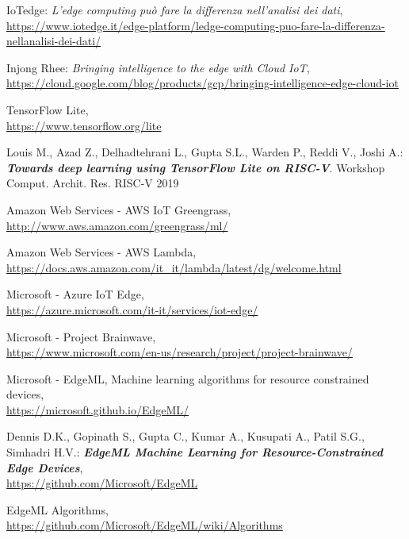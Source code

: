 \documentclass[a4paper,12pt,oneside]{book}
\begin{document}
\clearpage
\pagestyle{plain}
\fancyfoot[R]{}
\begin{thebibliography}{9}



	IoTedge: \textit{L'edge computing può fare la differenza nell’analisi dei dati},
	\\\url{https://www.iotedge.it/edge-platform/ledge-computing-puo-fare-la-differenza-nellanalisi-dei-dati/}
	
	Injong Rhee: \textit{Bringing intelligence to the edge with Cloud IoT},
	\\\url{https://cloud.google.com/blog/products/gcp/bringing-intelligence-edge-cloud-iot}
		
	TensorFlow Lite,
	\\\url{https://www.tensorflow.org/lite}
	
	Louis M., Azad Z., Delhadtehrani L., Gupta S.L., Warden P., Reddi V., Joshi A.: \textbf{\textit{Towards deep learning using TensorFlow Lite on RISC-V}}. Workshop Comput. Archit. Res. RISC-V 2019
	
	Amazon Web Services - AWS IoT Greengrass,
	\\\url{http://www.aws.amazon.com/greengrass/ml/}
	
	Amazon Web Services - AWS Lambda,
	\\\url{https://docs.aws.amazon.com/it_it/lambda/latest/dg/welcome.html}
	
	Microsoft - Azure IoT Edge,
	\\\url{https://azure.microsoft.com/it-it/services/iot-edge/}
	
	Microsoft - Project Brainwave,
	\\\url{https://www.microsoft.com/en-us/research/project/project-brainwave/}
	
	Microsoft - EdgeML, Machine learning algorithms for resource constrained devices,
	\\\url{https://microsoft.github.io/EdgeML/}
	
	Dennis D.K., Gopinath S., Gupta C., Kumar A., Kusupati A., Patil S.G., Simhadri H.V.: \textbf{\textit{EdgeML Machine Learning for Resource-Constrained Edge Devices}},
	\\\url{https://github.com/Microsoft/EdgeML}
	
	EdgeML Algorithms,
	\\\url{https://github.com/Microsoft/EdgeML/wiki/Algorithms}
	

\end{thebibliography}
\end{document}
